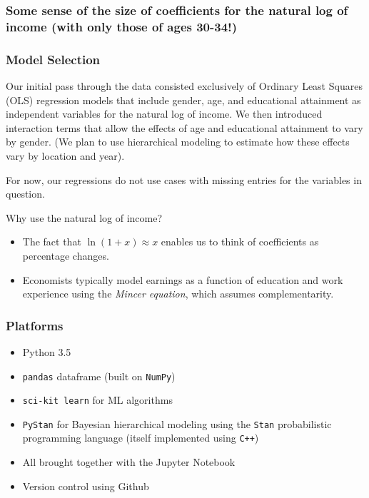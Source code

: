 \documentclass{beamer}
\let\olditem=\item
\renewcommand{\item}{\olditem \justifying}
\begin{document}
  
  \frame %
  {
  \frametitle{Some sense of the size of coefficients for the natural log of income (with only those of ages 30-34!)}
  
  

  
  }
  



\frame %
{
  \frametitle{Model Selection}
  Our initial pass through the data consisted exclusively of Ordinary Least Squares (OLS) regression models that include gender, age, and educational attainment as independent variables for the natural log of income. We then introduced interaction terms that allow the effects of age and educational attainment to vary by gender. (We plan to use hierarchical modeling to estimate how these effects vary by location and year). \newline
  
  \begin{small}
  For now, our regressions do not use cases with missing entries for the variables in question.  
  \end{small}
  
  \begin{block}{Why use the natural log of income?}
  \begin{itemize}
  \item The fact that $\ln(1+x) \approx x$ enables us to think of coefficients as percentage changes.
  \item Economists typically model earnings as a function of education and work experience using the \emph{Mincer equation}, which assumes complementarity.
  \end{itemize}
  \end{block}
  
  }

\frame %
{
  \frametitle{Platforms}
  \begin{itemize}
  \item Python 3.5
  \item \texttt{pandas} dataframe (built on \texttt{NumPy})
  \item \texttt{sci-kit learn} for ML algorithms
  \item \texttt{PyStan} for Bayesian hierarchical modeling using the \newline \texttt{Stan} probabilistic programming language (itself implemented using \texttt{C++})
  \item All brought together with the Jupyter Notebook
  \item Version control using Github
  \end{itemize}
}
\end{document}
